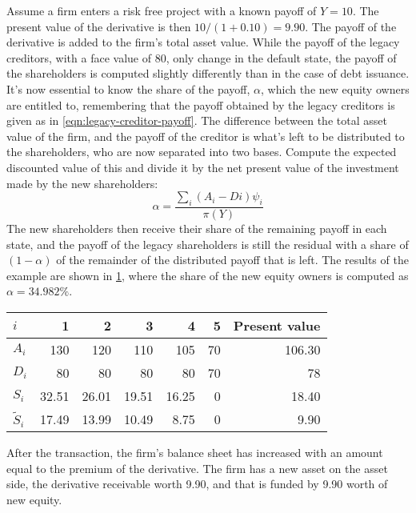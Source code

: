 \documentclass[../main.tex]{subfiles}
\begin{document}
        Assume a firm enters a risk free project with a known payoff of $Y=10$. The present value of the derivative is then $10/(1+0.10)=9.90$. The payoff of the derivative is added to the firm's total asset value. While the payoff of the legacy creditors, with a face value of 80, only change in the default state, the payoff of the shareholders is computed slightly differently than in the case of debt issuance. It's now essential to know the share of the payoff, $\alpha$, which the new equity owners are entitled to, remembering that the payoff obtained by the legacy creditors is given as in \cref{eqn:legacy-creditor-payoff}. The difference between the total asset value of the firm, and the payoff of the creditor is what's left to be distributed to the shareholders, who are now separated into two bases. Compute the expected discounted value of this and divide it by the net present value of the investment made by the new shareholders:
        \begin{equation}
            \alpha = \frac{\sum_i (A_{i}-D{i})\psi_{i}}{\pi(Y)}
        \end{equation}
        The new shareholders then receive their share of the remaining payoff in each state, and the payoff of the legacy shareholders is still the residual with a share of $(1-\alpha)$ of the remainder of the distributed payoff that is left. The results of the example are shown in \cref{tbl:equity-funding-payoff}, where the share of the new equity owners is computed as $\alpha = 34.982\%$.

        \begin{table}[h]
            \centering\begin{tabular}{l|rrrrr||r}
                $i$ & 1 & 2 & 3 & 4 & 5 & Present value \\
                \hline
                $A_{i}$ & 130 & 120 & 110 & 105 & 70 & 106.30 \\
                $D_{i}$ & 80 & 80 & 80 & 80 & 70 & 78 \\
                $S_{i}$ & 32.51 & 26.01 & 19.51 & 16.25 & 0 & 18.40 \\
                $\tilde{S}_{i}$ & 17.49 & 13.99 & 10.49 & 8.75 & 0 & 9.90 \\
            \end{tabular}
            \label{tbl:equity-funding-payoff}
        \end{table}

        After the transaction, the firm's balance sheet has increased with an amount equal to the premium of the derivative. The firm has a new asset on the asset side, the derivative receivable worth 9.90, and that is funded by 9.90 worth of new equity.
\end{document}
